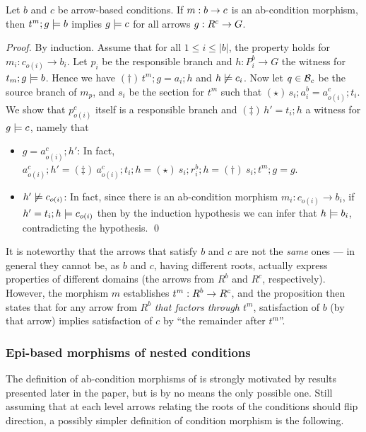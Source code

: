 \begin{proposition}
Let $b$ and $c$  be arrow-based conditions. If $m:b\rightarrow c$ is an ab-condition morphism, then $t^m;g\models b$ implies $g \models c$ for all arrows $g:R^c\rightarrow G$.
\end{proposition}
%
\emph{Proof.} By induction. Assume that for all $1\leq i\leq |b|$, the property holds for $m_i:c_{o(i)} \to b_i$. Let $p_i$ be the responsible branch and $h: P^b_i \to G$ the witness for $t_m;g\models b$. 
Hence we have $(\dagger)\, t^m; g=a_i;h$ and $h \not\models c_i$.  Now let $q \in \mathcal{B}_c$ be the source branch of $m_{p}$, and $s_i$ be the section for $t^m$ such that $(\star)\, s_i;a^b_i = a^c_{o(i)}; t_i$. 
We show that $p^c_{o(i)}$ itself is a responsible branch and $(\ddagger)\, h'=t_i;h$ a witness for $g\models c$, namely that 
\begin{itemize}
\item $g = a^c_{o(i)};h'$: In fact, $a^c_{o(i)};h' =\!(\ddagger)\ a^c_{o(i)};t_i;h =\!(\star)\ s_i;r^b_i; h  =\!(\dagger)\ s_i;t^m;g = g$. 
\item $h' \not\models c_{o(i)}$: In fact, since there is an ab-condition morphism $m_i: c_{o(i)} \to b_i$, if $h'= t_i;h \models c_{o(i)}$ then by the induction hypothesis we can infer that $h \models b_i$, contradicting the hypothesis. \qed
\end{itemize}

It is noteworthy that the arrows that satisfy $b$ and $c$ are not the \emph{same} ones --- in general they cannot be, as $b$ and $c$, having different roots, actually express properties of different domains (the arrows from $R^b$ and $R^c$, respectively). However, the morphism $m$ establishes $t^m:R^b\rightarrow R^c$, and the proposition then states that for any arrow from $R^b$ \emph{that factors through $t^m$}, satisfaction of $b$ (by that arrow) implies satisfaction of $c$ by ``the remainder after $t^m$''.


\subsubsection{Epi-based morphisms of nested conditions}

The definition of ab-condition morphisms of  is strongly motivated by results presented later in the paper, but is by no means the only possible one. Still assuming that at each level arrows relating the roots of the conditions should flip direction, a possibly simpler definition of condition morphism is the following.  

